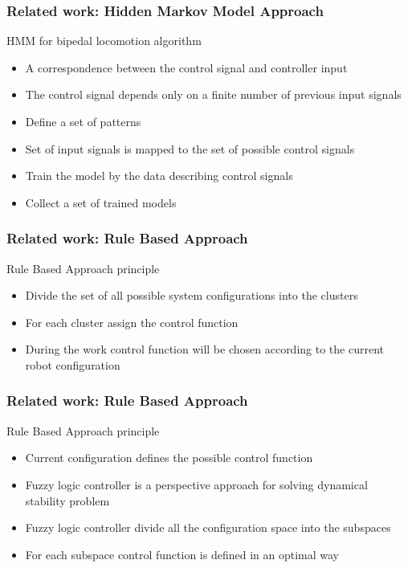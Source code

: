 \documentclass{beamer}
\begin{document}
	
	\begin{frame}
		\frametitle{Related work: Hidden Markov Model Approach}
		\begin{block}{HMM for bipedal locomotion algorithm}
			\begin{itemize}
				\item
				A correspondence between the control signal and controller input
				\item 
				The control signal depends only on a finite number of previous input signals
				\item
				Define a set of patterns
				\item
				Set of input signals is mapped to the set of possible control signals
				\item
				Train the model by the data describing control signals
				\item
				Collect a set of trained models
			\end{itemize}
		\end{block}
	\end{frame}
	
	
	\begin{frame}
		\frametitle{Related work: Rule Based Approach}
		\begin{block}{Rule Based Approach principle}
			\begin{itemize}
				\item
				Divide the set of all possible system configurations into the clusters
				\item 
				For each cluster assign the control function
				\item During the work control function will be chosen according to the current robot configuration
			\end{itemize}
		\end{block}
	\end{frame}
	
	
	\begin{frame}
		\frametitle{Related work: Rule Based Approach}
		\begin{block}{Rule Based Approach principle}
			\begin{itemize}
				\item
				Current configuration defines the possible control function
				\item Fuzzy logic controller is a perspective approach for solving dynamical stability problem
				\item Fuzzy logic controller divide all the configuration space into the subspaces
				\item For each subspace control function is defined in an optimal way
			\end{itemize}
		\end{block}
	\end{frame}
	
\end{document}
